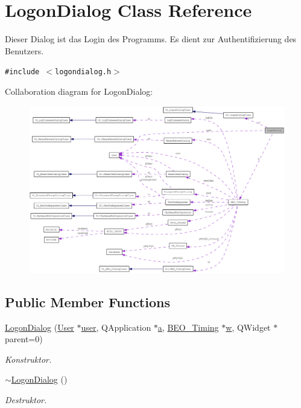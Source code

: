 \hypertarget{class_logon_dialog}{
\section{LogonDialog Class Reference}
\label{class_logon_dialog}
}
Dieser Dialog ist das Login des Programms. Es dient zur Authentifizierung des Benutzers.  


{\tt \#include $<$logondialog.h$>$}

Collaboration diagram for LogonDialog:\nopagebreak
\begin{figure}[H]
\begin{center}
\leavevmode
\includegraphics[width=400pt]{class_logon_dialog__coll__graph}
\end{center}
\end{figure}
\subsection*{Public Member Functions}
\begin{CompactItemize}
\item 
\hyperlink{class_logon_dialog_fd0f4977c07e5fbc9173d4ac35489f8b}{LogonDialog} (\hyperlink{class_user}{User} $\ast$\hyperlink{class_logon_dialog_60af9ce2cb403ef6ae38953b9c78e2ee}{user}, QApplication $\ast$\hyperlink{class_logon_dialog_cc6f7b558e791bdb79d0c522209306c2}{a}, \hyperlink{class_b_e_o___timing}{BEO\_\-Timing} $\ast$\hyperlink{class_logon_dialog_1c32b591de3a058059ed985b5f470ca0}{w}, QWidget $\ast$parent=0)
\begin{CompactList}\small\item\em Konstruktor. \item\end{CompactList}\item 
\hyperlink{class_logon_dialog_da40d3f09891af804cce52c6b46ee597}{$\sim$LogonDialog} ()
\begin{CompactList}\small\item\em Destruktor. \item\end{CompactList}\end{CompactItemize}
